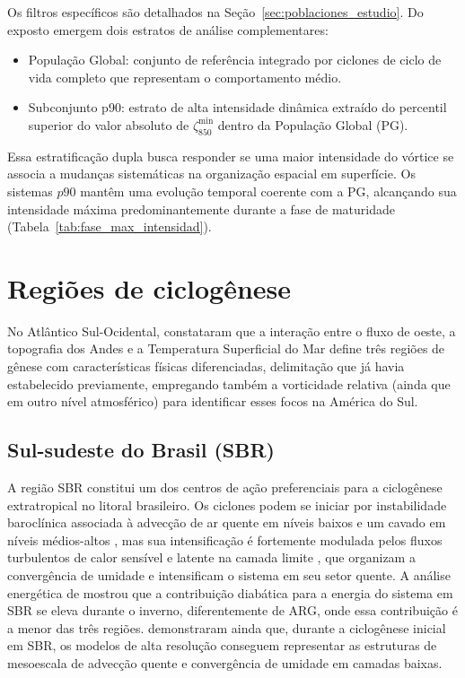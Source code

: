 Os filtros específicos são detalhados na Seção~\ref{sec:poblaciones_estudio}.
Do exposto emergem dois estratos de análise complementares:
\begin{itemize}
\item População Global: conjunto de referência integrado por ciclones de ciclo de vida completo que representam o comportamento médio.
\item Subconjunto p90: estrato de alta intensidade dinâmica extraído do percentil superior do valor absoluto de $\zeta_{850}^{\min}$ dentro da População Global (PG).
\end{itemize}
Essa estratificação dupla busca responder se uma maior intensidade do vórtice se associa a mudanças sistemáticas na organização espacial em superfície.
Os sistemas $p90$ mantêm uma evolução temporal coerente com a PG, alcançando sua intensidade máxima predominantemente durante a fase de maturidade (Tabela~\ref{tab:fase_max_intensidad}).


\section{Regiões de ciclogênese}\label{sec:tb_regiones}
No Atlântico Sul-Ocidental, \citet{gramcianinov2019properties} constataram que a interação entre o fluxo de oeste, a topografia dos Andes \citep{gan1994influence} e a Temperatura Superficial do Mar define três regiões de gênese com características físicas diferenciadas, delimitação que \citet{reboita2010south} já havia estabelecido previamente, empregando também a vorticidade relativa (ainda que em outro nível atmosférico) para identificar esses focos na América do Sul.

\subsection{Sul-sudeste do Brasil (SBR)}\label{subsec:tb_sbr}
A região SBR constitui um dos centros de ação preferenciais para a ciclogênese extratropical no litoral brasileiro.
Os ciclones podem se iniciar por instabilidade baroclínica associada à advecção de ar quente em níveis baixos e um cavado em níveis médios-altos \citep{gozzo2014subtropical}, mas sua intensificação é fortemente modulada pelos fluxos turbulentos de calor sensível e latente na camada limite \citep{gozzo2013air}, que organizam a convergência de umidade e intensificam o sistema em seu setor quente.
A análise energética de \citet{coutodesouza2024thesis} mostrou que a contribuição diabática para a energia do sistema em SBR se eleva durante o inverno, diferentemente de ARG, onde essa contribuição é a menor das três regiões.
\citet{gramcianinov2024early} demonstraram ainda que, durante a ciclogênese inicial em SBR, os modelos de alta resolução conseguem representar as estruturas de mesoescala de advecção quente e convergência de umidade em camadas baixas.

